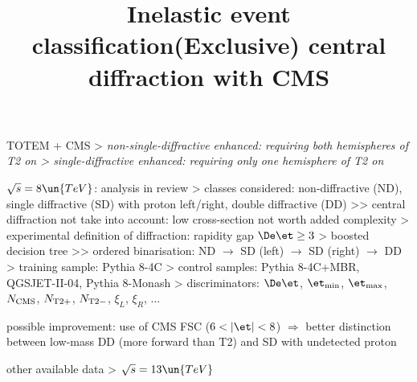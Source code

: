 


\newpage %

\vskip-1mm
\> TOTEM + CMS
\>> \em{non-single-diffractive enhanced}: requiring both hemispheres of T2 on
\>> \em{single-diffractive enhanced}: requiring only one hemisphere of T2 on

\centerline{
	\hskip3mm
}


\vskip-1mm


\newpage %
\title{Inelastic event classification}

\> $\sqrt s = 8\un{TeV}$: analysis in review
\>> classes considered: non-diffractive (ND), single diffractive (SD) with proton left/right, double diffractive (DD)
\>>> central diffraction not take into account: low cross-section not worth added complexity
\>> experimental definition of diffraction: rapidity gap $\De\et \ge 3$
\>> boosted decision tree
\>>> ordered binarisation: ND $\rightarrow$ SD (left) $\rightarrow$ SD (right) $\rightarrow$ DD
\>> training sample: Pythia 8-4C
\>> control samples: Pythia 8-4C+MBR, QGSJET-II-04, Pythia 8-Monash
\>> discriminators: $\De\et$, $\et_{\rm min}$, $\et_{\rm max}$, $N_{\rm CMS}$, $N_{\rm T2+}$, $N_{\rm T2-}$, $\xi_L$, $\xi_R$, ...

\> possible improvement: use of CMS FSC ($6 < |\et| < 8$) $\Rightarrow$ better distinction between low-mass DD (more forward than T2) and SD with undetected proton


\> other available data
\>> $\sqrt s = 13\un{TeV}$



\newpage %
\title{(Exclusive) central diffraction with CMS}

